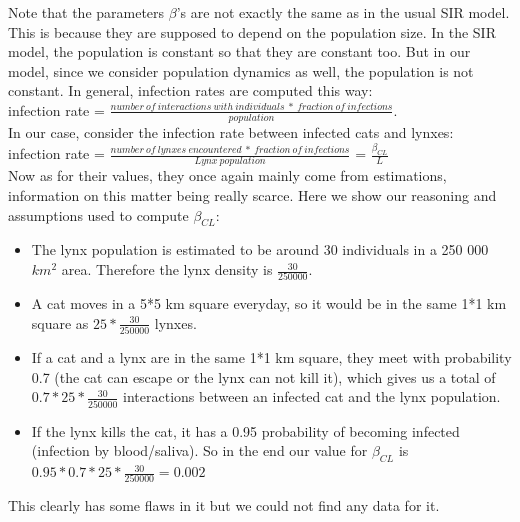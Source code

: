 \documentclass[12pt]{article}
\begin{document}
\quad Note that the parameters $\beta$'s are not exactly the same as in the usual SIR model. This is because they are supposed to depend on the population size. In the SIR model, the population is constant so that they are constant too. But in our model, since we consider population dynamics as well, the population is not constant. In general, infection rates are computed this way:\\

infection rate = $\frac{number \ of \ interactions \ with \ individuals \ * \ fraction \ of \ infections}{population}$. 
\\

In our case, consider the infection rate between infected cats and lynxes:
\\

infection rate = $\frac{number \ of \ lynxes \ encountered  \ * \ fraction \ of \ infections}{Lynx \ population}$ = $\frac{\beta_{CL}}{L}$
\\

\quad Now as for their values, they once again mainly come from estimations, information on this matter being really scarce. Here we show our reasoning and assumptions used to compute $\beta_{CL}$:

\begin{itemize}
    \item The lynx population is estimated to be around 30 individuals in a 250 000 $km^{2}$ area. Therefore the lynx density is $\frac{30}{250 000}$. 
    \item A cat moves in a 5*5 km square everyday, so it would be in the same 1*1 km square as $25 * \frac{30}{250 000}$ lynxes.
    \item If a cat and a lynx are in the same 1*1 km square, they meet with probability 0.7 (the cat can escape or the lynx can not kill it), which gives us a total of $0.7 * 25 * \frac{30}{250 000}$ interactions between an infected cat and the lynx population.
    \item If the lynx kills the cat, it has a 0.95 probability of becoming infected (infection by blood/saliva). So in the end our value for $\beta_{CL}$ is $0.95 * 0.7 * 25 * \frac{30}{250 000} = 0.002$
\end{itemize}

\quad This clearly has some flaws in it but we could not find any data for it.
\end{document}
